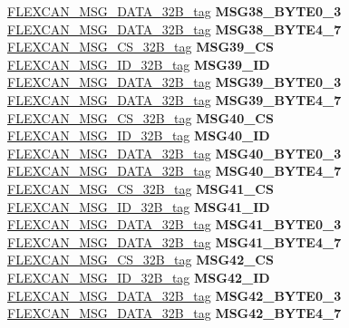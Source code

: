 \begin{DoxyCompactItemize}
\begin{tabbing}
\>\>\mbox{\hyperlink{unionFLEXCAN__MSG__DATA__32B__tag}{FLEXCAN\_MSG\_DATA\_32B\_tag}} {\bfseries MSG38\_BYTE0\_3}\\
\>\>\mbox{\hyperlink{unionFLEXCAN__MSG__DATA__32B__tag}{FLEXCAN\_MSG\_DATA\_32B\_tag}} {\bfseries MSG38\_BYTE4\_7}\\
\>\>\mbox{\hyperlink{unionFLEXCAN__MSG__CS__32B__tag}{FLEXCAN\_MSG\_CS\_32B\_tag}} {\bfseries MSG39\_CS}\\
\>\>\mbox{\hyperlink{unionFLEXCAN__MSG__ID__32B__tag}{FLEXCAN\_MSG\_ID\_32B\_tag}} {\bfseries MSG39\_ID}\\
\>\>\mbox{\hyperlink{unionFLEXCAN__MSG__DATA__32B__tag}{FLEXCAN\_MSG\_DATA\_32B\_tag}} {\bfseries MSG39\_BYTE0\_3}\\
\>\>\mbox{\hyperlink{unionFLEXCAN__MSG__DATA__32B__tag}{FLEXCAN\_MSG\_DATA\_32B\_tag}} {\bfseries MSG39\_BYTE4\_7}\\
\>\>\mbox{\hyperlink{unionFLEXCAN__MSG__CS__32B__tag}{FLEXCAN\_MSG\_CS\_32B\_tag}} {\bfseries MSG40\_CS}\\
\>\>\mbox{\hyperlink{unionFLEXCAN__MSG__ID__32B__tag}{FLEXCAN\_MSG\_ID\_32B\_tag}} {\bfseries MSG40\_ID}\\
\>\>\mbox{\hyperlink{unionFLEXCAN__MSG__DATA__32B__tag}{FLEXCAN\_MSG\_DATA\_32B\_tag}} {\bfseries MSG40\_BYTE0\_3}\\
\>\>\mbox{\hyperlink{unionFLEXCAN__MSG__DATA__32B__tag}{FLEXCAN\_MSG\_DATA\_32B\_tag}} {\bfseries MSG40\_BYTE4\_7}\\
\>\>\mbox{\hyperlink{unionFLEXCAN__MSG__CS__32B__tag}{FLEXCAN\_MSG\_CS\_32B\_tag}} {\bfseries MSG41\_CS}\\
\>\>\mbox{\hyperlink{unionFLEXCAN__MSG__ID__32B__tag}{FLEXCAN\_MSG\_ID\_32B\_tag}} {\bfseries MSG41\_ID}\\
\>\>\mbox{\hyperlink{unionFLEXCAN__MSG__DATA__32B__tag}{FLEXCAN\_MSG\_DATA\_32B\_tag}} {\bfseries MSG41\_BYTE0\_3}\\
\>\>\mbox{\hyperlink{unionFLEXCAN__MSG__DATA__32B__tag}{FLEXCAN\_MSG\_DATA\_32B\_tag}} {\bfseries MSG41\_BYTE4\_7}\\
\>\>\mbox{\hyperlink{unionFLEXCAN__MSG__CS__32B__tag}{FLEXCAN\_MSG\_CS\_32B\_tag}} {\bfseries MSG42\_CS}\\
\>\>\mbox{\hyperlink{unionFLEXCAN__MSG__ID__32B__tag}{FLEXCAN\_MSG\_ID\_32B\_tag}} {\bfseries MSG42\_ID}\\
\>\>\mbox{\hyperlink{unionFLEXCAN__MSG__DATA__32B__tag}{FLEXCAN\_MSG\_DATA\_32B\_tag}} {\bfseries MSG42\_BYTE0\_3}\\
\>\>\mbox{\hyperlink{unionFLEXCAN__MSG__DATA__32B__tag}{FLEXCAN\_MSG\_DATA\_32B\_tag}} {\bfseries MSG42\_BYTE4\_7}\\

\end{tabbing}
\end{DoxyCompactItemize}
